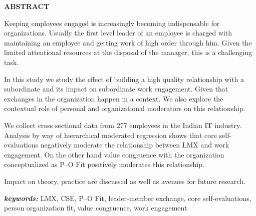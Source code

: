 \newpage

\vspace{\fill}

\begin{center}
\textbf{ABSTRACT}
\end{center}

Keeping employees engaged is increasingly becoming indispensable for organizations. Usually the first level leader of an employee is charged with maintaining an employee and getting work of high order through him. Given the limited attentional resources at the disposal of the manager, this is a challenging task.

In this study we study the effect of building a high quality relationship with a subordinate and its impact on subordinate work engagement. Given that exchanges in the organization happen in a context. We also explore the contextual role of personal and organizational moderators on this relationship.

We collect cross sectional data from 277 employees in the Indian IT industry. Analysis by way of hierarchical moderated regression shows that core self-evaluations negatively moderate the relationship between LMX and work engagement. On the other hand value congruence with the organization conceptualized as P--O Fit positively moderates this relationship.

Impact on theory, practice are discussed as well as avenues for future research.

\emph{\textbf{keywords:}} LMX, CSE, P--O Fit, leader-member exchange, core self-evaluations, person organization fit, value congruence, work engagement

\vfill

\newpage

\doublespacing

